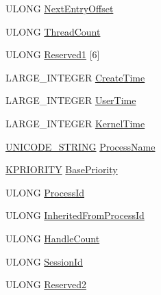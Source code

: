 \begin{DoxyCompactItemize}
\item 
U\-L\-O\-N\-G \hyperlink{struct___s_y_s_t_e_m___p_r_o_c_e_s_s___i_n_f_o_r_m_a_t_i_o_n_accc60594e809bb9fe3431634ccb6dba1}{Next\-Entry\-Offset}
\item 
U\-L\-O\-N\-G \hyperlink{struct___s_y_s_t_e_m___p_r_o_c_e_s_s___i_n_f_o_r_m_a_t_i_o_n_aa31be6d46ff52f0ed8fd4bd30e6ac5b3}{Thread\-Count}
\item 
U\-L\-O\-N\-G \hyperlink{struct___s_y_s_t_e_m___p_r_o_c_e_s_s___i_n_f_o_r_m_a_t_i_o_n_ab3cb7f34ee51bee28f2e4739b2a499c7}{Reserved1} \mbox{[}6\mbox{]}
\item 
L\-A\-R\-G\-E\-\_\-\-I\-N\-T\-E\-G\-E\-R \hyperlink{struct___s_y_s_t_e_m___p_r_o_c_e_s_s___i_n_f_o_r_m_a_t_i_o_n_aef78e19675884de1b21e68e40de55026}{Create\-Time}
\item 
L\-A\-R\-G\-E\-\_\-\-I\-N\-T\-E\-G\-E\-R \hyperlink{struct___s_y_s_t_e_m___p_r_o_c_e_s_s___i_n_f_o_r_m_a_t_i_o_n_a26114ada5e4c6fb17878659ca0472041}{User\-Time}
\item 
L\-A\-R\-G\-E\-\_\-\-I\-N\-T\-E\-G\-E\-R \hyperlink{struct___s_y_s_t_e_m___p_r_o_c_e_s_s___i_n_f_o_r_m_a_t_i_o_n_af71bd30dc0e0deaf4beb49cfe6a37077}{Kernel\-Time}
\item 
\hyperlink{ntdll_8h_afb1771465aaa5d77efedcfc1a3a43dfb}{U\-N\-I\-C\-O\-D\-E\-\_\-\-S\-T\-R\-I\-N\-G} \hyperlink{struct___s_y_s_t_e_m___p_r_o_c_e_s_s___i_n_f_o_r_m_a_t_i_o_n_a27903e47488296c51403c888e5117799}{Process\-Name}
\item 
\hyperlink{ntdll_8h_ade7f74903369701780e5940b2d929167}{K\-P\-R\-I\-O\-R\-I\-T\-Y} \hyperlink{struct___s_y_s_t_e_m___p_r_o_c_e_s_s___i_n_f_o_r_m_a_t_i_o_n_ac99c514f0083571e392eb4e665600ea2}{Base\-Priority}
\item 
U\-L\-O\-N\-G \hyperlink{struct___s_y_s_t_e_m___p_r_o_c_e_s_s___i_n_f_o_r_m_a_t_i_o_n_ad6edb7257ed0e5c802d9eb6e7ab5b3f0}{Process\-Id}
\item 
U\-L\-O\-N\-G \hyperlink{struct___s_y_s_t_e_m___p_r_o_c_e_s_s___i_n_f_o_r_m_a_t_i_o_n_adfab8280be22fb80b8daf1fd310cea17}{Inherited\-From\-Process\-Id}
\item 
U\-L\-O\-N\-G \hyperlink{struct___s_y_s_t_e_m___p_r_o_c_e_s_s___i_n_f_o_r_m_a_t_i_o_n_aee41fc2ce3919c41b6d39c6d8a1be045}{Handle\-Count}
\item 
U\-L\-O\-N\-G \hyperlink{struct___s_y_s_t_e_m___p_r_o_c_e_s_s___i_n_f_o_r_m_a_t_i_o_n_adcf5c890ab63438693073f5b8439e0be}{Session\-Id}
\item 
U\-L\-O\-N\-G \hyperlink{struct___s_y_s_t_e_m___p_r_o_c_e_s_s___i_n_f_o_r_m_a_t_i_o_n_a5ec9d54313d2b13711db9d3512eb39eb}{Reserved2}

\end{DoxyCompactItemize}
